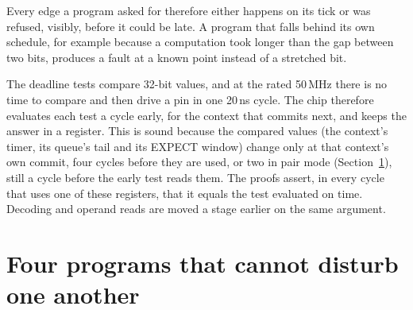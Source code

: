 \documentclass[conference,letterpaper]{IEEEtran}
\begin{document}
Every edge a program asked for therefore either happens on its tick or was refused,
visibly, before it could be late. A program that falls behind its own schedule, for
example because a computation took longer than the gap between two bits, produces a
fault at a known point instead of a stretched bit.

The deadline tests compare 32-bit values, and at the rated 50\,MHz there is no time to
compare and then drive a pin in one 20\,ns cycle. The chip therefore evaluates each test
a cycle early, for the context that commits next, and keeps the answer in a register.
This is sound because the compared values (the context's timer, its queue's tail and its
EXPECT window) change only at that context's own commit, four cycles before they are
used, or two in pair mode (Section~\ref{sec:barrel}), still a cycle before the early test
reads them. The proofs assert, in every cycle that uses one of these registers, that it equals
the test evaluated on time. Decoding and operand reads are moved a stage earlier on the
same argument.

\section{Four programs that cannot disturb one another}
\label{sec:barrel}
\end{document}

